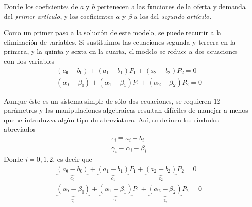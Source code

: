 Donde los coeficientes de \(a\) y \(b\) pertenecen a las funciones de la oferta y demanda del \textit{primer artículo}, y los coeficientes \(\alpha\) y \(\beta\) a los del \textit{segundo artículo}. 

Como un primer paso a la solución de este modelo, se puede recurrir a la eliminación de variables. Si sustituimos las ecuaciones segunda y tercera en la primera, y la quinta y sexta en la cuarta, el modelo se reduce a dos ecuaciones con dos variables 
\begin{equation}
    \begin{aligned}
        & (a_0-b_0)+(a_1-b_1)P_1+(a_2-b_2)P_2=0 \\
        & (\alpha_0-\beta_0)+(\alpha_1-\beta_1)P_1+(\alpha_2-\beta_2)P_2=0
    \end{aligned}
\end{equation}

Aunque éste es un sistema simple de sólo dos ecuaciones, se requieren \(12\) parámetros y las manipulaciones algebraicas resultan difíciles de manejar a menos que se introduzca algún tipo de abreviatura. Así, se definen los símbolos abreviados
\begin{equation}
    \begin{aligned}
        & c_i \equiv a_i-b_i \\
        & \gamma_i \equiv \alpha_i-\beta_i
    \end{aligned}
\end{equation}
Donde \(i=0,1,2\), es decir que
\begin{equation}
    \begin{aligned}
        & \underbrace{(a_0-b_0)}_{c_0}+\underbrace{(a_1-b_1)}_{c_1}P_1+\underbrace{(a_2-b_2)}_{c_2}P_2=0 \\
        & \underbrace{(\alpha_0-\beta_0)}_{\gamma_0}+\underbrace{(\alpha_1-\beta_1)}_{\gamma_1}P_1+\underbrace{(\alpha_2-\beta_2)}_{\gamma_2}P_2=0
    \end{aligned}
\end{equation}

